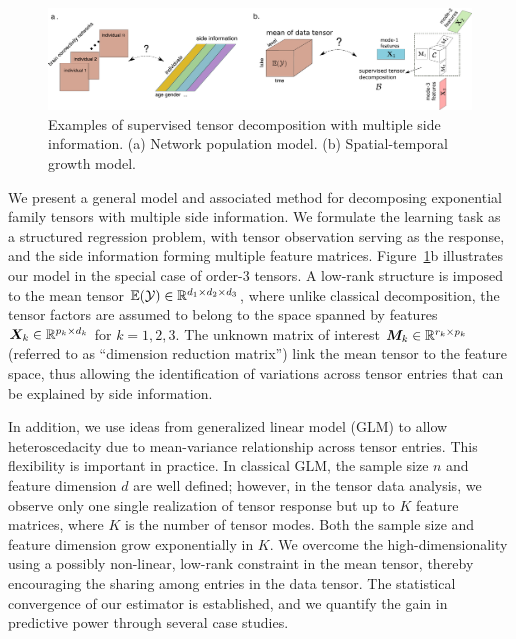 \documentclass[12pt]{article}
\theoremstyle{plain}
\theoremstyle{definition}
\begin{document}
\begin{figure}[t]
\begin{center}
\includegraphics[width=16cm]{new_introfigure1.pdf}
\end{center}
\caption{Examples of supervised tensor decomposition with multiple side information. (a) Network population model. (b) Spatial-temporal growth model. }\label{fig:intro1}
\end{figure}

We present a general model and associated method for decomposing exponential family tensors with multiple side information. 
We formulate the learning task as a structured regression problem, with tensor observation serving as the response, and the side information forming multiple feature matrices. Figure~\ref{fig:intro1}b illustrates our model in the special case of order-3 tensors. A low-rank structure is imposed to the mean tensor $\mathbb{E}(\mathcal{Y})\in\mathbb{R}^{d_1\times d_2\times d_3}$, where unlike classical decomposition, the tensor factors are assumed to belong to the space spanned by features $\bm X_k\in\mathbb{R}^{p_k\times d_k}$ for $k=1,2,3$. The unknown matrix of interest $\bm M_k\in\mathbb{R}^{r_k\times p_k}$ (referred to as ``dimension reduction matrix'') link the mean tensor to the feature space, thus allowing the identification of variations across tensor entries that can be explained by side information.

In addition, we use ideas from generalized linear model (GLM) to allow heteroscedacity due to mean-variance relationship across tensor entries. This flexibility is important in practice. In classical GLM, the sample size $n$ and feature dimension $d$ are well defined; however, in the tensor data analysis, we observe only one single realization of tensor response but up to $K$ feature matrices, where $K$ is the number of tensor modes.  Both the sample size and feature dimension grow exponentially in $K$. We overcome the high-dimensionality using a possibly non-linear, low-rank constraint in the mean tensor, thereby encouraging the sharing among entries in the data tensor. The statistical convergence of our estimator is established, and we quantify the gain in predictive power through several case studies. 
 
\end{document}

